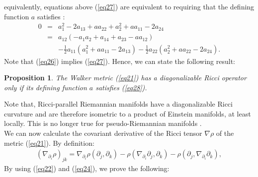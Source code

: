 \documentclass[reqno, 12pt]{amsart}
\numberwithin{equation}{section}
\newtheorem{proposition}[theorem]{Proposition}
\begin{document}
equivalently, equations above (\ref{eq27}) are equivalent to requiring that the defining function $a$ satisfies :
\begin{eqnarray}\label{eq28}
0 &=& a_{1}^{2} - 2a_{13} + aa_{22} + a_{2}^{2} + a a_{11} -2 a_{24}\nonumber \\
 &=&  a_{12} (-a_1a_2 + a_{14} + a_{23} - aa_{12}) \nonumber \\
&& - \frac{1}{2} a_{11} (a_1^2 + aa_{11}- 2 a_{13} ) 
 - \frac{1}{2}a_{22} ( a_{2}^2 + a a_{22} - 2 a_{24} ). 
\end{eqnarray}
Note that (\ref{eq26}) implies (\ref{eq27}). Hence, we can state the following result:

\begin{proposition}
The Walker metric  (\ref{eq21}) has a diagonalizable Ricci operator
only if its defining function $a$ satisfies (\ref{eq28}).
\end{proposition}

Note that, Ricci-parallel Riemannian manifolds have a diagonalizable 
Ricci curvature and are therefore isometric to a product of Einstein manifolds, at least locally. This is no longer true for pseudo-Riemannian manifolds \cite{Boubel2001}.\\ 

We can now calculate the covariant derivative of the Ricci tensor 
$\nabla\rho$ of the metric (\ref{eq21}).  By definition:
\begin{eqnarray*}
(\nabla_{\partial_i}\rho)_{jk} = \nabla_{\partial_i}\rho(\partial_j,\partial_k)
- \rho(\nabla_{\partial_i} \partial_j, \partial_k)
- \rho(\partial_j, \nabla_{\partial_i} \partial_k),
\end{eqnarray*}
By using (\ref{eq22}) and (\ref{eq24}), we prove the following:
\end{document}
